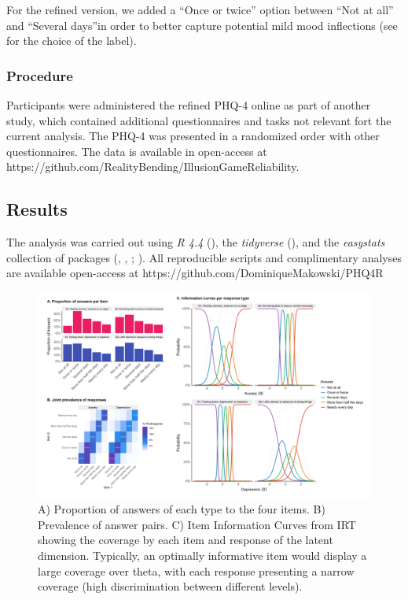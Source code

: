 \documentclass[
  jou,
  longtable,
  nolmodern,
  notxfonts,
  notimes,
  mask,
  colorlinks=true,linkcolor=blue,citecolor=blue,urlcolor=blue]{apa7}
\begin{document}
For the refined version, we added a ``Once or twice'' option between
``Not at all'' and ``Several days''in order to better capture potential
mild mood inflections (see  for the choice of the label).

\subsubsection{Procedure}\label{procedure}

Participants were administered the refined PHQ-4 online as part of
another study, which contained additional questionnaires and tasks not
relevant fort the current analysis. The PHQ-4 was presented in a
randomized order with other questionnaires. The data is available in
open-access at
https://github.com/RealityBending/IllusionGameReliability.

\subsection{Results}\label{results}

The analysis was carried out using \emph{R 4.4}
(), the \emph{tidyverse}
(), and the
\emph{easystats} collection of packages
(,
,
;
). All
reproducible scripts and complimentary analyses are available
open-access at https://github.com/DominiqueMakowski/PHQ4R

\begin{figure}[!htbp]

{\caption{{A) Proportion of answers of each type to the four items. B)
Prevalence of answer pairs. C) Item Information Curves from IRT showing
the coverage by each item and response of the latent dimension.
Typically, an optimally informative item would display a large coverage
over theta, with each response presenting a narrow coverage (high
discrimination between different levels).}{\label{fig-one}}}}

\includegraphics[width=1\linewidth,height=\textheight,keepaspectratio]{../../study1/figures/figure1.png}

\end{figure}
\end{document}
